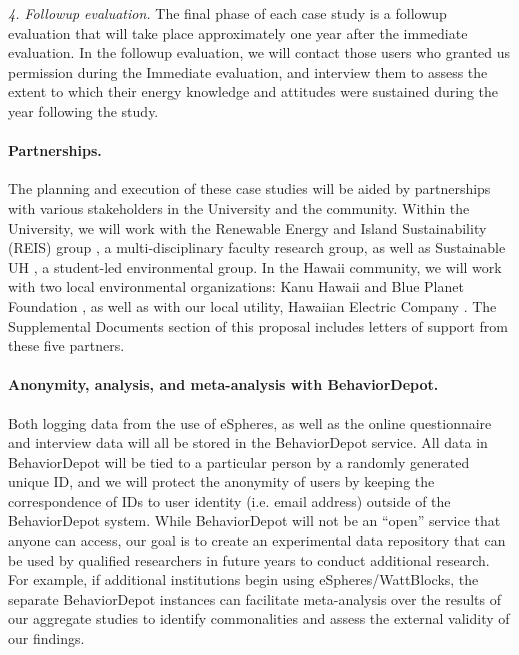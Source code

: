 {\em 4. Followup evaluation.}  The final phase of each case study
is a followup evaluation that will take place approximately one year after
the immediate evaluation.   In the followup evaluation, we will contact
those users who granted us permission during the Immediate evaluation, and
interview them to assess the extent to which their energy knowledge and
attitudes were sustained during the year following the study. 

\paragraph{Partnerships.}

The planning and execution of these case studies will be aided by 
partnerships with various stakeholders in the University and the community.
Within the University, we will work with the Renewable Energy and Island
Sustainability (REIS) group \cite{REIS}, a multi-disciplinary faculty
research group, as well as Sustainable UH \cite{SustainableUH}, a
student-led environmental group.  In the Hawaii community, we will work
with two local environmental organizations: Kanu Hawaii \cite{KanuHawaii}
and Blue Planet Foundation \cite{BluePlanetFoundation}, as well as with our
local utility, Hawaiian Electric Company \cite{HECO}.  The Supplemental
Documents section of this proposal includes letters of support from these
five partners.

\paragraph{Anonymity, analysis,  and meta-analysis with BehaviorDepot.}

Both logging data from the use of eSpheres, as well as the online
questionnaire and interview data will all be stored in the BehaviorDepot
service.  All data in BehaviorDepot will be tied to a particular person by
a randomly generated unique ID, and we will protect the anonymity of users
by keeping the correspondence of IDs to user identity (i.e. email address)
outside of the BehaviorDepot system.  While BehaviorDepot will not be an
``open'' service that anyone can access, our goal is to create an
experimental data repository that can be used by qualified researchers in
future years to conduct additional research.  For example, if additional
institutions begin using eSpheres/WattBlocks, the separate BehaviorDepot
instances can facilitate meta-analysis over the results of our aggregate
studies to identify commonalities and assess the external validity of our
findings.


